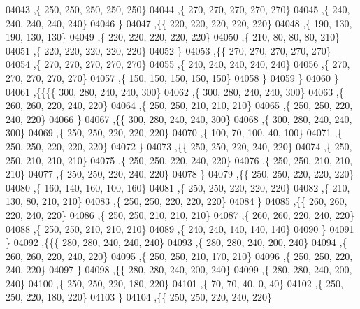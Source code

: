 \begin{DoxyCode}
04043     ,\{   250,   250,   250,   250,   250\}
04044     ,\{   270,   270,   270,   270,   270\}
04045     ,\{   240,   240,   240,   240,   240\}
04046     \}
04047    ,\{\{   220,   220,   220,   220,   220\}
04048     ,\{   190,   130,   190,   130,   130\}
04049     ,\{   220,   220,   220,   220,   220\}
04050     ,\{   210,    80,    80,    80,   210\}
04051     ,\{   220,   220,   220,   220,   220\}
04052     \}
04053    ,\{\{   270,   270,   270,   270,   270\}
04054     ,\{   270,   270,   270,   270,   270\}
04055     ,\{   240,   240,   240,   240,   240\}
04056     ,\{   270,   270,   270,   270,   270\}
04057     ,\{   150,   150,   150,   150,   150\}
04058     \}
04059    \}
04060   \}
04061  ,\{\{\{\{   300,   280,   240,   240,   300\}
04062     ,\{   300,   280,   240,   240,   300\}
04063     ,\{   260,   260,   220,   240,   220\}
04064     ,\{   250,   250,   210,   210,   210\}
04065     ,\{   250,   250,   220,   240,   220\}
04066     \}
04067    ,\{\{   300,   280,   240,   240,   300\}
04068     ,\{   300,   280,   240,   240,   300\}
04069     ,\{   250,   250,   220,   220,   220\}
04070     ,\{   100,    70,   100,    40,   100\}
04071     ,\{   250,   250,   220,   220,   220\}
04072     \}
04073    ,\{\{   250,   250,   220,   240,   220\}
04074     ,\{   250,   250,   210,   210,   210\}
04075     ,\{   250,   250,   220,   240,   220\}
04076     ,\{   250,   250,   210,   210,   210\}
04077     ,\{   250,   250,   220,   240,   220\}
04078     \}
04079    ,\{\{   250,   250,   220,   220,   220\}
04080     ,\{   160,   140,   160,   100,   160\}
04081     ,\{   250,   250,   220,   220,   220\}
04082     ,\{   210,   130,    80,   210,   210\}
04083     ,\{   250,   250,   220,   220,   220\}
04084     \}
04085    ,\{\{   260,   260,   220,   240,   220\}
04086     ,\{   250,   250,   210,   210,   210\}
04087     ,\{   260,   260,   220,   240,   220\}
04088     ,\{   250,   250,   210,   210,   210\}
04089     ,\{   240,   240,   140,   140,   140\}
04090     \}
04091    \}
04092   ,\{\{\{   280,   280,   240,   240,   240\}
04093     ,\{   280,   280,   240,   200,   240\}
04094     ,\{   260,   260,   220,   240,   220\}
04095     ,\{   250,   250,   210,   170,   210\}
04096     ,\{   250,   250,   220,   240,   220\}
04097     \}
04098    ,\{\{   280,   280,   240,   200,   240\}
04099     ,\{   280,   280,   240,   200,   240\}
04100     ,\{   250,   250,   220,   180,   220\}
04101     ,\{    70,    70,    40,     0,    40\}
04102     ,\{   250,   250,   220,   180,   220\}
04103     \}
04104    ,\{\{   250,   250,   220,   240,   220\}

\end{DoxyCode}
